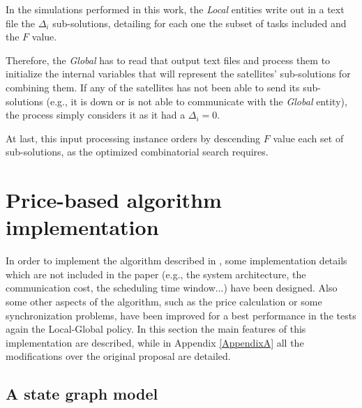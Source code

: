 In the simulations performed in this work, the \emph{Local} entities write out in a text file the $\Delta_i$ sub-solutions, detailing for each one the subset of tasks included and the $F$ value.

Therefore, the \emph{Global} has to read that output text files and process them to initialize the internal variables that will represent the satellites' sub-solutions for combining them. If any of the satellites has not been able to send its sub-solutions (e.g., it is down or is not able to communicate with the \emph{Global} entity), the process simply considers it as it had a $\Delta_i = 0$.

At last, this input processing instance orders by descending $F$ value each set of sub-solutions, as the optimized combinatorial search requires.


\section{Price-based algorithm implementation}
\label{sec_MBimplementation}

In order to implement the algorithm described in \cite{Edalat09}, some implementation details which are not included in the paper (e.g., the system architecture, the communication cost, the scheduling time window...) have been designed. Also some other aspects of the algorithm, such as the price calculation or some synchronization problems, have been improved for a best performance in the tests again the Local-Global policy. In this section the main features of this implementation are described, while in Appendix \ref{AppendixA} all the modifications over the original proposal are detailed.

\subsection{A state graph model}

